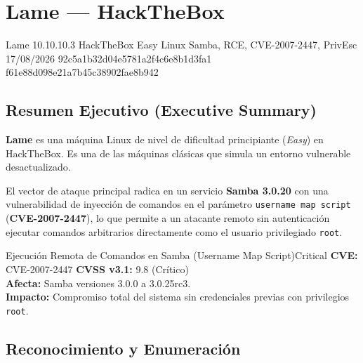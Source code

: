 \documentclass[../../../main_compilation.tex]{subfiles}
\begin{document}
\section[HTB - Lame (10.10.10.3)]{Lame — HackTheBox}
\label{sec:htb-lame}

\targetSummary%
{Lame}
{10.10.10.3}
{HackTheBox}
{Easy}
{Linux}
{Samba, RCE, CVE-2007-2447, PrivEsc}
{17/08/2026}
{92c5a1b32d04e5781a2f4c6e8b1d3fa1}
{f61e88d098e21a7b45c38902fae8b942}


\vspace{0.5cm}%

\subsection{Resumen Ejecutivo (Executive Summary)}
\textbf{Lame} es una máquina Linux de nivel de dificultad principiante (\textit{Easy}) en HackTheBox. Es una de las máquinas clásicas que simula un entorno vulnerable desactualizado.

El vector de ataque principal radica en un servicio \textbf{Samba 3.0.20} con una vulnerabilidad de inyección de comandos en el parámetro \texttt{username map script} (\textbf{CVE-2007-2447}), lo que permite a un atacante remoto sin autenticación ejecutar comandos arbitrarios directamente como el usuario privilegiado \texttt{root}.

\begin{vulnbox}{Ejecución Remota de Comandos en Samba (Username Map Script)}{Critical}
	\textbf{CVE:} CVE-2007-2447 \hfill \textbf{CVSS v3.1:} 9.8 (Crítico)\\
	\textbf{Afecta:} Samba versiones 3.0.0 a 3.0.25rc3.\\
	\textbf{Impacto:} Compromiso total del sistema sin credenciales previas con privilegios \texttt{root}.
\end{vulnbox}

\subsection{Reconocimiento y Enumeración}
\end{document}
